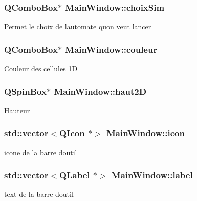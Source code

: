 \subsubsection[{\texorpdfstring{choix\+Sim}{choixSim}}]{\setlength{\rightskip}{0pt plus 5cm}Q\+Combo\+Box$\ast$ Main\+Window\+::choix\+Sim\hspace{0.3cm}{\ttfamily [private]}}\hypertarget{class_main_window_a11ee55d02a2bccaf673267f930bc0f90}{}\label{class_main_window_a11ee55d02a2bccaf673267f930bc0f90}
Permet le choix de l\textquotesingle{}automate qu\textquotesingle{}on veut lancer 
\subsubsection[{\texorpdfstring{couleur}{couleur}}]{\setlength{\rightskip}{0pt plus 5cm}Q\+Combo\+Box$\ast$ Main\+Window\+::couleur\hspace{0.3cm}{\ttfamily [private]}}\hypertarget{class_main_window_aae0246fdb4536b62a90c2fd39fef98ab}{}\label{class_main_window_aae0246fdb4536b62a90c2fd39fef98ab}
Couleur des cellules 1D 
\subsubsection[{\texorpdfstring{haut2D}{haut2D}}]{\setlength{\rightskip}{0pt plus 5cm}Q\+Spin\+Box$\ast$ Main\+Window\+::haut2D\hspace{0.3cm}{\ttfamily [private]}}\hypertarget{class_main_window_aea127325b7c01f02b7a98b17595326bb}{}\label{class_main_window_aea127325b7c01f02b7a98b17595326bb}
Hauteur 
\subsubsection[{\texorpdfstring{icon}{icon}}]{\setlength{\rightskip}{0pt plus 5cm}std\+::vector$<$Q\+Icon $\ast$$>$ Main\+Window\+::icon\hspace{0.3cm}{\ttfamily [private]}}\hypertarget{class_main_window_ab903c7e6c6310d5ae1455d5935ec446a}{}\label{class_main_window_ab903c7e6c6310d5ae1455d5935ec446a}
icone de la barre d\textquotesingle{}outil 
\subsubsection[{\texorpdfstring{label}{label}}]{\setlength{\rightskip}{0pt plus 5cm}std\+::vector$<$Q\+Label $\ast$$>$ Main\+Window\+::label\hspace{0.3cm}{\ttfamily [private]}}\hypertarget{class_main_window_a4d2abb2a3dc6e601f8ed99ec58879f79}{}\label{class_main_window_a4d2abb2a3dc6e601f8ed99ec58879f79}
text de la barre d\textquotesingle{}outil 
